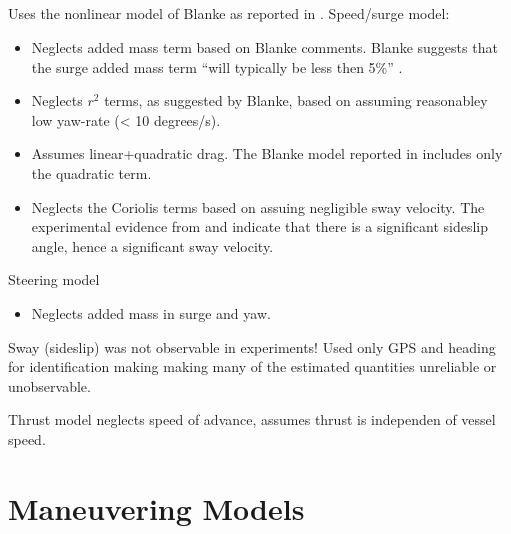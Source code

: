 \documentclass[11pt,draftcls,journal,onecolumn]{../latexlib/latex_ieee/IEEEtran}
\begin{document}
\subsection{\cite{caccia08practical}}
Uses the nonlinear model of Blanke \cite{blanke81ship} as reported in \cite{fossen94guidance}.  Speed/surge model:
\begin{itemize}
\item Neglects added mass term based on Blanke comments.  Blanke suggests that the surge added mass term ``will typically be less then 5\%'' \cite{fossen94guidance}.
\item Neglects $r^2$ terms, as suggested by Blanke, based on assuming reasonabley low yaw-rate (< 10 degrees/s). 
\item Assumes linear+quadratic drag.  The Blanke model reported in \cite{fossen94guidance} includes only the quadratic term.  
\item Neglects the Coriolis terms based on assuing negligible sway velocity.  The experimental evidence from \cite{sonnenburg13modeling} and \cite{sonnenburg10control} indicate that there is a significant sideslip angle, hence a significant sway velocity.
\end{itemize}
Steering model
\begin{itemize}
\item Neglects added mass in surge and yaw.
\end{itemize}
Sway (sideslip) was not observable in experiments!  Used only GPS and heading for identification making making many of the estimated quantities unreliable or unobservable.

Thrust model neglects speed of advance, assumes thrust is independen of vessel speed.


\section{Maneuvering Models}
\end{document}
